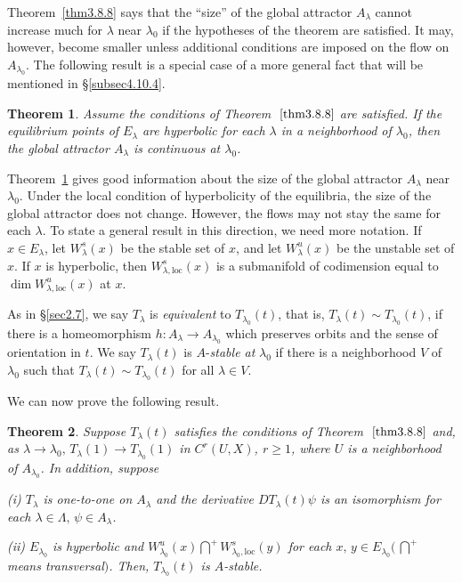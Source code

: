\documentclass{surv-l}
\theoremstyle{plain}
\newtheorem{theorem}{Theorem}[section]
\theoremstyle{definition}
\numberwithin{equation}{section}
\numberwithin{figure}{chapter}
\begin{document}
Theorem~\ref{thm3.8.8} says that the ``size'' of the global attractor $A_{\lambda}$ cannot increase much for $\lambda$ near $\lambda_{0}$ if the hypotheses of the theorem are satisfied. It may, however, become smaller unless additional conditions are imposed on the flow on $A_{\lambda_{0}}$. The following result is a special case of a more general fact that will be mentioned in \S\ref{subsec4.10.4}.

\begin{theorem}\label{thm3.8.9} Assume the conditions of Theorem $~\ref{thm3.8.8}$ are satisfied. If the equilibrium points of $E_{\lambda}$ are hyperbolic for each $\lambda$ in a neighborhood of $\lambda_{0}$, then the global attractor $A_{\lambda}$ is continuous at $\lambda_{0}$.
\end{theorem}

Theorem~\ref{thm3.8.9} gives good information about the size of the global attractor $A_{\lambda}$ near $\lambda_{0}$. Under the local condition of hyperbolicity of the equilibria, the size of the global attractor does not change. However, the flows may not stay the same for each $\lambda$. To state a general result in this direction, we need more notation. If $x\in E_{\lambda}$, let $W_{\lambda}^{s}(x)$ be the stable set of $x$, and let $W_{\lambda}^{u}(x)$ be the unstable set of $x$. If $x$ is hyperbolic, then $W_{\lambda,\mathrm{loc}}^{s}(x)$ is a submanifold of codimension equal to $\dim W_{\lambda,\mathrm{loc}}^{u}(x)$ at $x$.

As in \S\ref{sec2.7}, we say $T_{\lambda}$ is \emph{equivalent} to $T_{\lambda_{0}}(t)$, that is, $T_{\lambda}(t)\sim T_{\lambda_{0}}(t)$, if there is a homeomorphism $h\!:A_{\lambda}\rightarrow A_{\lambda_{0}}$ which preserves orbits and the sense of orientation in $t$. We say $T_{\lambda}(t)$ is $A$-\emph{stable at} $\lambda_{0}$ if there is a neighborhood $V$ of $\lambda_{0}$ such that $T_{\lambda}(t)\sim T_{\lambda_{0}}(t)$ for all $\lambda\in V$.

We can now prove the following result.

\begin{theorem}\label{thm3.8. 10} Suppose $T_{\lambda}(t)$ satisfies the conditions of Theorem $~\ref{thm3.8.8}$ and, as $\lambda \rightarrow\lambda_{0},\, T_{\lambda}(1)\rightarrow T_{\lambda_{0}}(1)$ in $C^{r}(U, X)$, $r\geq 1$, where $U$ is a neighborhood of $A_{\lambda_{0}}$. In addition, suppose

\emph{(i)} $T_{\lambda}$ is one-to-one on $A_{\lambda}$ and the derivative $ DT_{\lambda}(t)\psi$ is an isomorphism for each $\lambda\in\Lambda,\, \psi\in A_{\lambda}$.

\emph{(ii)} $E_{\lambda_{0}}$ is hyperbolic and $W_{\lambda_{0}}^{u}(x){{\bigcap\limits^{+}}} W_{\lambda_{0},\mathrm{loc}}^{s}(y)$ for each $x,\, y\in E_{\lambda_{0}}(\,\bigcap\limits^{+}$ means transversal$)$.
\noindent Then, $T_{\lambda_{0}}(t)$ is $A$-stable.
\end{theorem}
\end{document}
